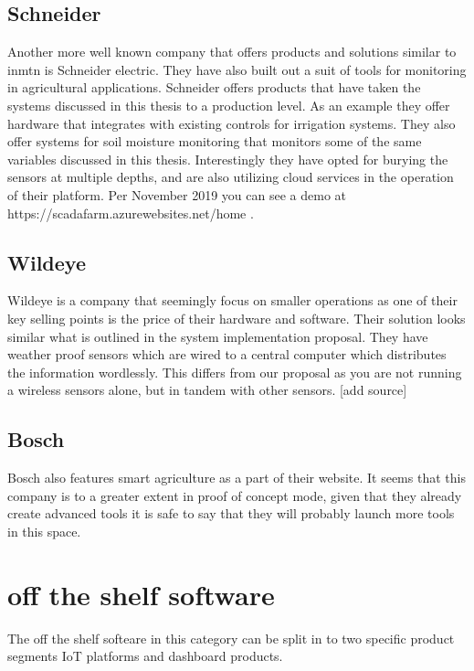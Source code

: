 \documentclass[]{uiophd}
\begin{document}
\subsection{Schneider}
Another more well known company that offers products and solutions similar to inmtn is Schneider electric. They have also built out a suit of tools for monitoring in agricultural applications. Schneider offers products that have taken the systems discussed in this thesis to a production level. As an example they offer hardware that integrates with existing controls for irrigation systems. They also offer systems for soil moisture monitoring that monitors some of the same variables discussed in this thesis. Interestingly they have opted for burying the sensors at multiple depths, and are also utilizing cloud services in the operation of their platform. Per November 2019 you can see a demo at https://scadafarm.azurewebsites.net/home . 

\subsection{Wildeye}
Wildeye is a company that seemingly focus on smaller operations as one of their key selling points is the price of their hardware and software. Their solution looks similar what is outlined in the system implementation proposal. They have weather proof sensors which are wired to a central computer which distributes the information wordlessly. This differs from our proposal as you are not running a wireless sensors alone, but in tandem with other sensors. [add source]

\subsection{Bosch}
Bosch also features smart agriculture as a part of their website. It seems that this company is to a greater extent in proof of concept mode, given that they already create advanced tools it is safe to say that they will probably launch more tools in this space.


\section{off the shelf software}
The off the shelf softeare in this category can be split in to two specific product segments IoT platforms and dashboard products.
\end{document}
